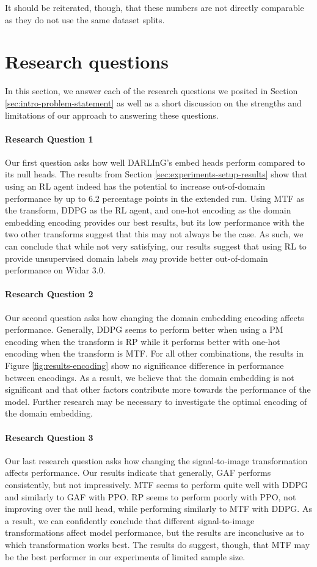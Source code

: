 It should be reiterated, though, that these numbers are not directly comparable as they do not use the same dataset splits.

\section{Research questions}

In this section, we answer each of the research questions we posited in Section \ref{sec:intro-problem-statement} as well as a short discussion on the strengths and limitations of our approach to answering these questions.

\paragraph{Research Question 1}
Our first question asks how well DARLInG's embed heads perform compared to its null heads.
The results from Section \ref{sec:experiments-setup-results} show that using an RL agent indeed has the potential to increase out-of-domain performance by up to 6.2 percentage points in the extended run.
Using MTF as the transform, DDPG as the RL agent, and one-hot encoding as the domain embedding encoding provides our best results, but its low performance with the two other transforms suggest that this may not always be the case.
As such, we can conclude that while not very satisfying, our results suggest that using RL to provide unsupervised domain labels \textit{may} provide better out-of-domain performance on Widar 3.0.

\paragraph{Research Question 2}
Our second question asks how changing the domain embedding encoding affects performance.
Generally, DDPG seems to perform better when using a PM encoding when the transform is RP while it performs better with one-hot encoding when the transform is MTF.
For all other combinations, the results in Figure \ref{fig:results-encoding} show no significance difference in performance between encodings.
As a result, we believe that the domain embedding is not significant and that other factors contribute more towards the performance of the model.
Further research may be necessary to investigate the optimal encoding of the domain embedding.

\paragraph{Research Question 3}
Our last research question asks how changing the signal-to-image transformation affects performance.
Our results indicate that generally, GAF performs consistently, but not impressively.
MTF seems to perform quite well with DDPG and similarly to GAF with PPO.
RP seems to perform poorly with PPO, not improving over the null head, while performing similarly to MTF with DDPG.
As a result, we can confidently conclude that different signal-to-image transformations affect model performance, but the results are inconclusive as to which transformation works best.
The results do suggest, though, that MTF may be the best performer in our experiments of limited sample size.

